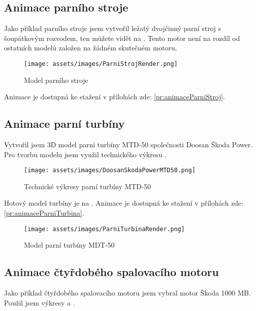 \subsection{Animace parního stroje}
{Jako příklad parního stroje jsem vytvořil ležatý dvojčinný parní stroj s šoupátkovým rozvodem, ten můžete vidět na . Tento motor není na rozdíl od ostatních modelů založen na žádném skutečném motoru.}

\begin{figure}[H]
    \centering
    \texttt{[image: assets/images/ParniStrojRender.png]}
    \caption{Model parního stroje \jaObr}
    \label{obr:ParniStrojRender}
\end{figure}

{Animace je dostupná ke stažení v přílohách zde: \ref{pr:animaceParniStroj}.}

\newpage

\subsection{Animace parní turbíny}
{Vytvořil jsem 3D model parní turbíny MTD-50 společnosti Doosan Škoda Power. Pro tvorbu modelu jsem využil technického výkresu .}
\cite{SP:ApplicationAspectsOfSteamTurbinesForCombinedHeatAndPowerGeneration}

\begin{figure}[H]
    \centering
    \texttt{[image: assets/images/DoosanSkodaPowerMTD50.png]}
    \caption{Technické výkresy parní turbíny MTD-50 \cite{SP:ApplicationAspectsOfSteamTurbinesForCombinedHeatAndPowerGeneration}}
    \label{obr:DoosanSkodaPowerMTD50}
\end{figure}

{Hotový model turbíny je na . Animace je dostupná ke stažení v přílohách zde: \ref{pr:animaceParniTurbina}.}

\begin{figure}[H]
    \centering
    \texttt{[image: assets/images/ParniTurbinaRender.png]}
    \caption{Model parní turbíny MDT-50 \jaObr}
    \label{obr:ParniTurbinaRender}
\end{figure}

\newpage

\subsection{Animace čtyřdobého spalovacího motoru}
{Jako příklad čtyřdobého spalovacího motoru jsem vybral motor Škoda 1000 MB. Použil jsem výkresy  a .}
\cite{AUTOMOBIL:Skoda1000MBLegendaSlavi60Let}

